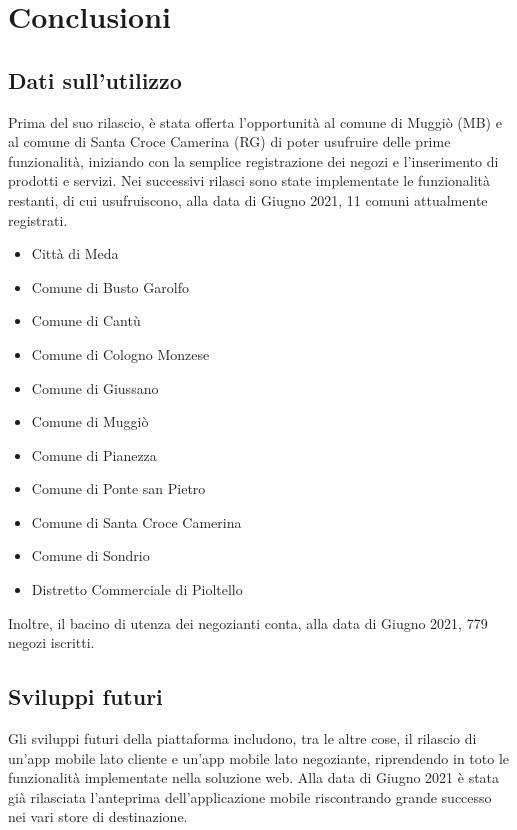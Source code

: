 \chapter{Conclusioni}
\section{Dati sull'utilizzo}
Prima del suo rilascio, è stata offerta l'opportunità al comune di Muggiò (MB) e al comune di Santa Croce Camerina (RG) di poter usufruire delle prime funzionalità, iniziando con la semplice registrazione dei negozi e l'inserimento di prodotti e servizi. Nei successivi rilasci sono state implementate le funzionalità restanti, di cui usufruiscono, alla data di Giugno 2021, 11 comuni attualmente registrati. 
\begin{itemize}
    \item Città di Meda
    \item Comune di Busto Garolfo
    \item Comune di Cantù
    \item Comune di Cologno Monzese
    \item Comune di Giussano
    \item Comune di Muggiò
    \item Comune di Pianezza
    \item Comune di Ponte san Pietro
    \item Comune di Santa Croce Camerina
    \item Comune di Sondrio
    \item Distretto Commerciale di Pioltello
\end{itemize}
Inoltre, il bacino di utenza dei negozianti conta, alla data di Giugno 2021, 779 negozi iscritti.
\section{Sviluppi futuri}
Gli sviluppi futuri della piattaforma includono, tra le altre cose, il rilascio di un'app mobile lato cliente e un'app mobile lato negoziante, riprendendo in toto le funzionalità implementate nella soluzione web. Alla data di Giugno 2021 è stata già rilasciata l'anteprima dell'applicazione mobile riscontrando grande successo nei vari store di destinazione. 